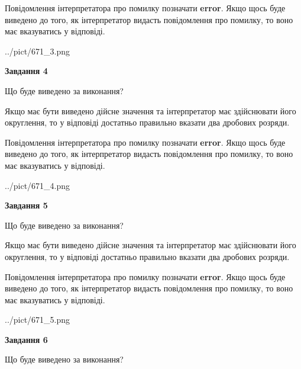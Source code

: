 \documentclass[12pt, ukrainian]{article}
\begin{document}
{\begin {Large}
Повідомлення інтерпретатора про помилку позначати \textbf{error}.
Якщо щось буде виведено до того, як інтерпретатор видасть повідомлення про помилку, 
то воно має вказуватись у відповіді. \par

\begin{center}
	{../pict/671_3.png}
\end{center}
\newpage

{\begin {center}\textbf{Завдання 4}\end {center}}\par
Що буде виведено за виконання? \par

Якщо має бути виведено дійсне значення та інтерпретатор має здійснювати його округлення, 
то у відповіді достатньо правильно вказати два дробових розряди.

Повідомлення інтерпретатора про помилку позначати \textbf{error}.
Якщо щось буде виведено до того, як інтерпретатор видасть повідомлення про помилку, 
то воно має вказуватись у відповіді. \par

\begin{center}
	{../pict/671_4.png}
\end{center}
\newpage

{\begin {center}\textbf{Завдання 5}\end {center}}\par
Що буде виведено за виконання? \par

Якщо має бути виведено дійсне значення та інтерпретатор має здійснювати його округлення, 
то у відповіді достатньо правильно вказати два дробових розряди.

Повідомлення інтерпретатора про помилку позначати \textbf{error}.
Якщо щось буде виведено до того, як інтерпретатор видасть повідомлення про помилку, 
то воно має вказуватись у відповіді. \par

\begin{center}
	{../pict/671_5.png}
\end{center}
\newpage

{\begin {center}\textbf{Завдання 6}\end {center}}\par
Що буде виведено за виконання? \par


\end{Large}}
\end{document}
